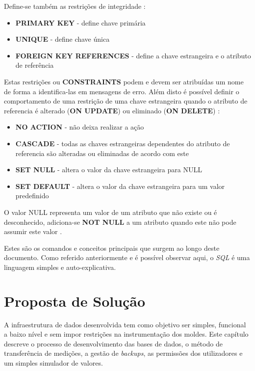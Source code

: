 \documentclass[11pt,twoside,a4paper]{report}
\begin{document}
Define-se também as restrições de integridade \cite{mysql}:
\begin{itemize}
	\item \textbf{PRIMARY KEY} - define chave primária
	\item \textbf{UNIQUE} - define chave única
	\item \textbf{FOREIGN KEY REFERENCES} - define a chave estrangeira e o atributo de referência
\end{itemize}
Estas restrições ou \textbf{CONSTRAINTS} podem e devem ser atribuídas um nome de forma a identifica-las em mensagens de erro. Além disto é possível definir o comportamento de uma restrição de uma chave estrangeira quando o atributo de referencia é alterado (\textbf{ON UPDATE}) ou eliminado (\textbf{ON DELETE}) \cite{mysql}:
\begin{itemize}
	\item \textbf{NO ACTION} - não deixa realizar a ação
	\item \textbf{CASCADE} - todas as chaves estrangeiras dependentes do atributo de referencia são alteradas ou eliminadas de acordo com este
	\item \textbf{SET NULL} - altera o valor da chave estrangeira para NULL
	\item \textbf{SET DEFAULT} - altera o valor da chave estrangeira para um valor predefinido
\end{itemize}
O valor NULL representa um valor de um atributo que não existe ou é desconhecido, adiciona-se \textbf{NOT NULL} a um atributo quando este não pode assumir este valor \cite{mysql}.\par 
Estes são os comandos e conceitos principais que surgem ao longo deste documento. Como referido anteriormente e é possível observar aqui, o \textit{SQL} é uma linguagem simples e auto-explicativa.

\cleardoublepage
\chapter{Proposta de Solução}
\label{chap:solucao}
A infraestrutura de dados desenvolvida tem como objetivo ser simples, funcional a baixo nível e sem impor restrições na instrumentação dos moldes. Este capítulo descreve o processo de desenvolvimento das bases de dados, o método de transferência de medições, a gestão de \textit{backups}, as permissões dos utilizadores e um simples simulador de valores.
\end{document}

